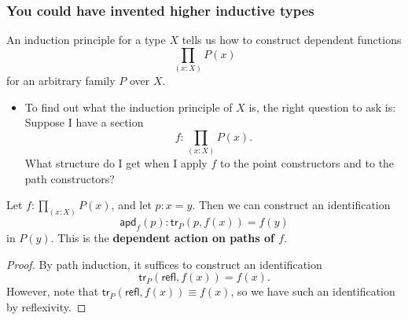 \documentclass[handout]{beamer}
\newcommand{\refl}{\mathsf{refl}}
\newcommand{\apd}{\mathsf{apd}}
\newcommand{\tr}{\mathsf{tr}}
\newcommand{\apply}[2]{#1(#2)}
\begin{document}
\begin{frame}
  \frametitle{You could have invented higher inductive types}
  An induction principle for a type $X$ tells us how to construct dependent functions
  \begin{equation*}
    \prod_{(x:X)}\apply{P}{x}
  \end{equation*}
  for an arbitrary family $P$ over $X$.\pause
  \begin{itemize}
  \item To find out what the induction principle of $X$ is, the right question to ask is: \\[1em]
    
    {\color{red}Suppose I have a section
      \begin{equation*}
        f:\prod_{(x:X)}\apply{P}{x}.  
      \end{equation*}
      What structure do I get when I apply $f$ to the point constructors and to the path constructors?}
  \end{itemize}
\end{frame}

\begin{frame}
  \begin{lemma}
    Let $f:\prod_{(x:X)}\apply{P}{x}$, and let $p:x=y$. Then we can construct an identification
    \begin{equation*}
      \apply{\apd_f}{p} : \apply{\tr_P}{p,\apply{f}{x}}=\apply{f}{y}
    \end{equation*}
    in $\apply{P}{y}$. This is the \textbf{dependent action on paths of $f$}.
  \end{lemma}\pause

  \begin{proof}
    By path induction, it suffices to construct an identification
    \begin{equation*}
      \apply{\tr_P}{\refl{},\apply{f}{x}}=\apply{f}{x}.
    \end{equation*}
    However, note that $\apply{\tr_P}{\refl{},\apply{f}{x}} \equiv \apply{f}{x}$, so we have such an identification by reflexivity.
  \end{proof}
\end{frame}
\end{document}
